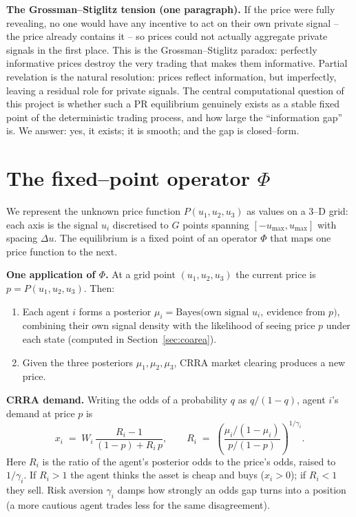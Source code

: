 \documentclass[11pt]{article}
\begin{document}
\textbf{The Grossman--Stiglitz tension (one paragraph).} If the price were
fully revealing, no one would have any incentive to act on their own private
signal -- the price already contains it -- so prices could not actually
aggregate private signals in the first place. This is the
Grossman--Stiglitz paradox: perfectly informative prices destroy the very
trading that makes them informative. Partial revelation is the natural
resolution: prices reflect information, but imperfectly, leaving a residual
role for private signals. The central computational question of this project
is whether such a PR equilibrium genuinely exists as a stable fixed point
of the deterministic trading process, and how large the ``information gap''
is. We answer: yes, it exists; it is smooth; and the gap is closed--form.

\section{The fixed--point operator $\Phi$}

We represent the unknown price function $P(u_1,u_2,u_3)$ as values on a
3--D grid: each axis is the signal $u_i$ discretised to $G$ points spanning
$[-u_{\max},u_{\max}]$ with spacing $\Delta u$. The equilibrium is a fixed
point of an operator $\Phi$ that maps one price function to the next.

\textbf{One application of $\Phi$.} At a grid point $(u_1,u_2,u_3)$ the
current price is $p=P(u_1,u_2,u_3)$. Then:
\begin{enumerate}
\item Each agent $i$ forms a posterior
  $\mu_i = \mathrm{Bayes}\big(\text{own signal }u_i,\ \text{evidence from }
  p\big)$, combining their own signal density with the likelihood of seeing
  price $p$ under each state (computed in Section~\ref{sec:coarea}).
\item Given the three posteriors $\mu_1,\mu_2,\mu_3$, CRRA market clearing
  produces a new price.
\end{enumerate}

\textbf{CRRA demand.} Writing the odds of a probability $q$ as
$q/(1-q)$, agent $i$'s demand at price $p$ is
\begin{equation}
  x_i \;=\; W_i\,\frac{R_i-1}{(1-p)+R_i\,p},
  \qquad
  R_i \;=\; \left(\frac{\mu_i/(1-\mu_i)}{p/(1-p)}\right)^{1/\gamma_i}.
  \label{eq:demand}
\end{equation}
Here $R_i$ is the ratio of the agent's posterior odds to the price's odds,
raised to $1/\gamma_i$. If $R_i>1$ the agent thinks the asset is cheap and
buys ($x_i>0$); if $R_i<1$ they sell. Risk aversion $\gamma_i$ damps how
strongly an odds gap turns into a position (a more cautious agent trades
less for the same disagreement).
\end{document}
